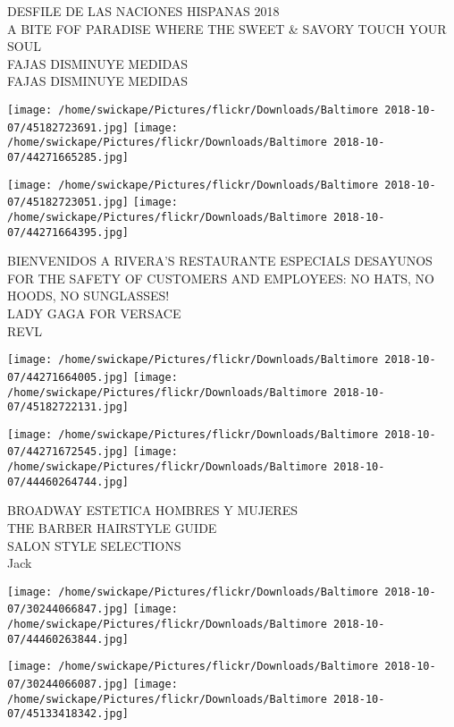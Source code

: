 \documentclass[10pt,letterpaper]{article}
\begin{document}
DESFILE DE LAS NACIONES HISPANAS 2018\\
A BITE FOF PARADISE WHERE THE SWEET \& SAVORY TOUCH YOUR SOUL\\
FAJAS DISMINUYE MEDIDAS\\
FAJAS DISMINUYE MEDIDAS\\
\pagebreak

\texttt{[image: /home/swickape/Pictures/flickr/Downloads/Baltimore 2018-10-07/45182723691.jpg]}
\texttt{[image: /home/swickape/Pictures/flickr/Downloads/Baltimore 2018-10-07/44271665285.jpg]}

\texttt{[image: /home/swickape/Pictures/flickr/Downloads/Baltimore 2018-10-07/45182723051.jpg]}
\texttt{[image: /home/swickape/Pictures/flickr/Downloads/Baltimore 2018-10-07/44271664395.jpg]}

BIENVENIDOS A RIVERA'S RESTAURANTE ESPECIALS DESAYUNOS\\
FOR THE SAFETY OF CUSTOMERS AND EMPLOYEES: NO HATS, NO HOODS, NO SUNGLASSES!\\
LADY GAGA FOR VERSACE\\
REVL\\
\pagebreak

\texttt{[image: /home/swickape/Pictures/flickr/Downloads/Baltimore 2018-10-07/44271664005.jpg]}
\texttt{[image: /home/swickape/Pictures/flickr/Downloads/Baltimore 2018-10-07/45182722131.jpg]}

\texttt{[image: /home/swickape/Pictures/flickr/Downloads/Baltimore 2018-10-07/44271672545.jpg]}
\texttt{[image: /home/swickape/Pictures/flickr/Downloads/Baltimore 2018-10-07/44460264744.jpg]}

BROADWAY ESTETICA HOMBRES Y MUJERES\\
THE BARBER HAIRSTYLE GUIDE\\
SALON STYLE SELECTIONS\\
Jack\\
\pagebreak

\texttt{[image: /home/swickape/Pictures/flickr/Downloads/Baltimore 2018-10-07/30244066847.jpg]}
\texttt{[image: /home/swickape/Pictures/flickr/Downloads/Baltimore 2018-10-07/44460263844.jpg]}

\texttt{[image: /home/swickape/Pictures/flickr/Downloads/Baltimore 2018-10-07/30244066087.jpg]}
\texttt{[image: /home/swickape/Pictures/flickr/Downloads/Baltimore 2018-10-07/45133418342.jpg]}
\end{document}
